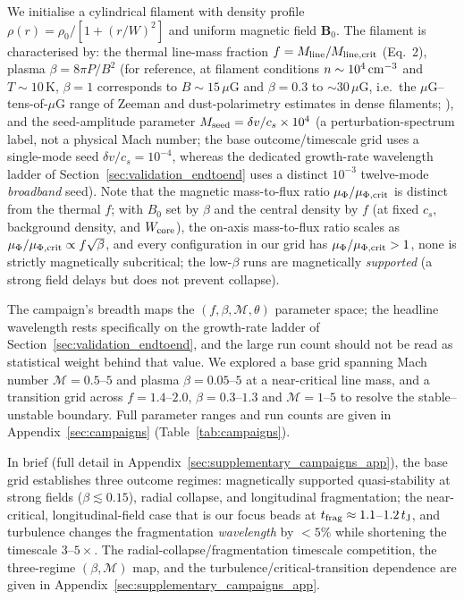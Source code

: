 \documentclass[usenatbib,twoside,twocolumn]{mnras}
\begin{document}
We initialise a cylindrical filament with density profile $\rho(r) = \rho_0 / [1 + (r/W)^2]$ and uniform magnetic field $\mathbf{B}_0$. The filament is characterised by: the thermal line-mass fraction $f = M_{\rm line}/M_{\rm line,crit}$ (Eq.~2), plasma $\beta = 8\pi P/B^2$ (for reference, at filament conditions $n\sim10^4\,{\rm cm^{-3}}$ and $T\sim10$\,K, $\beta=1$ corresponds to $B\sim15\,\mu$G and $\beta=0.3$ to $\sim30\,\mu$G, i.e.\ the $\mu$G--tens-of-$\mu$G range of Zeeman and dust-polarimetry estimates in dense filaments; \citealt{Crutcher2012}), and the seed-amplitude parameter $M_{\rm seed}=\delta v/c_s\times10^{4}$ (a perturbation-spectrum label, not a physical Mach number; the base outcome/timescale grid uses a single-mode seed $\delta v/c_s=10^{-4}$, whereas the dedicated growth-rate wavelength ladder of Section~\ref{sec:validation_endtoend} uses a distinct $10^{-3}$ twelve-mode \emph{broadband} seed). Note that the magnetic mass-to-flux ratio $\mu_\Phi/\mu_{\Phi,\rm crit}$ is distinct from the thermal $f$; with $B_0$ set by $\beta$ and the central density by $f$ (at fixed $c_s$, background density, and $W_{\rm core}$), the on-axis mass-to-flux ratio scales as $\mu_\Phi/\mu_{\Phi,\rm crit}\propto f\sqrt{\beta}$, and every configuration in our grid has $\mu_\Phi/\mu_{\Phi,\rm crit}>1$, none is strictly magnetically subcritical; the low-$\beta$ runs are magnetically \emph{supported} (a strong field delays but does not prevent collapse).

The campaign's breadth maps the $(f,\beta,\mathcal{M},\theta)$ parameter space; the headline wavelength rests specifically on the growth-rate ladder of Section~\ref{sec:validation_endtoend}, and the large run count should not be read as statistical weight behind that value. We explored a base grid spanning Mach number $\mathcal{M}=0.5$--$5$ and plasma $\beta=0.05$--$5$ at a near-critical line mass, and a transition grid across $f=1.4$--$2.0$, $\beta=0.3$--$1.3$ and $\mathcal{M}=1$--$5$ to resolve the stable--unstable boundary. Full parameter ranges and run counts are given in Appendix~\ref{sec:campaigns} (Table~\ref{tab:campaigns}).

In brief (full detail in Appendix~\ref{sec:supplementary_campaigns_app}), the base grid establishes three outcome regimes: magnetically supported quasi-stability at strong fields ($\beta\lesssim0.15$), radial collapse, and longitudinal fragmentation; the near-critical, longitudinal-field case that is our focus beads at $t_{\rm frag}\approx1.1$--$1.2\,t_{\rm J}$, and turbulence changes the fragmentation \emph{wavelength} by $<5\%$ while shortening the timescale $3$--$5\times$. The radial-collapse/fragmentation timescale competition, the three-regime $(\beta,\mathcal{M})$ map, and the turbulence/critical-transition dependence are given in Appendix~\ref{sec:supplementary_campaigns_app}.
\end{document}
